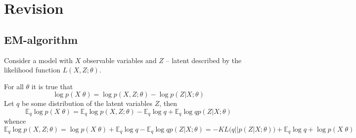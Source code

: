 \documentclass[a4paper]{article}
\newcommand{\Ex}[0]{{\mathbb{E}}}
\begin{document}
\section{Revision} %
\label{sec:revision}

\subsection{EM-algorithm} %
\label{sub:em_algorithm}

Consider a model with $X$ observable variables and $Z$ -- latent described by
the likelihood function $L(X,Z;\theta)$.

For all $\theta$ it is true that 
\[\log p(X\;\theta) = \log p(X,Z;\theta) - \log p(Z\lvert X;\theta)\]
Let $q$ be some distribution of the latent variables $Z$, then
\[ \Ex_q\log p(X\;\theta) = \Ex_q\log p(X,Z;\theta) - \Ex_q \log q + \Ex_q\log {q}{p(Z\lvert X;\theta)} \]
whence 
\[
\Ex_q\log p(X,Z;\theta)
= \log p(X\;\theta) + \Ex_q \log q - \Ex_q\log {q}{p(Z\lvert X;\theta)}
= - KL\bigl(q\lvert\rvert p(Z\lvert X;\theta)\bigr) + \Ex_q \log q + \log p(X\;\theta)
\]


\end{document}

